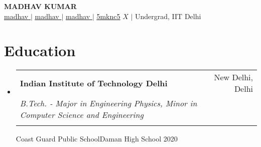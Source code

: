 \documentclass[letterpaper,11pt]{article}
\makeatletter
\newcommand{\resumeEduheading}[6]{
  \vspace{-2pt}\item
    \begin{tabular*}{0.97\textwidth}[t]{l@{\extracolsep{\fill}}r}
      \textbf{#1} & #2 \\
      \textit{\small #3}  & \text{\small #4} \\
      \text{\small #5}  & \textit{\small} \\
    \end{tabular*}\vspace{-7pt}
}
\newcommand{\resumeSubHeadingListStart}{\begin{itemize}[leftmargin=0.15in, label={}]}
\newcommand{\resumeSubHeadingListEnd}{\end{itemize}}
\makeatother
\begin{document}

\begin{center}
    \textbf{\Huge \scshape  MADHAV KUMAR } 
    \\ \vspace{10pt}
    \href{https://github.com/madhav-mknc}{\underline{madhav} \faGithub} $|$
    \href{https://www.linkedin.com/in/madhav-kumar-030785205/}{\underline{madhav} \faLinkedin} $|$
    \href{https://madhav-mknc.github.io/portfolio/}{\underline{madhav} \Mundus} $|$
   \href{https://twitter.com/5mknc5/}{\underline{5mknc5}} {$X$} $|$
    \small Undergrad, IIT Delhi
    
\end{center}


\section{Education}
  \resumeSubHeadingListStart
    \resumeEduheading
      {Indian Institute of Technology Delhi}{New Delhi, Delhi}
      {B.Tech. - Major in Engineering Physics, Minor in Computer Science and Engineering}
      {2020 -- Present}
      {}

    \resumeEduheading
      {Coast Guard Public School}{Daman}
      {High School}
      {2020}
      {}


  \resumeSubHeadingListEnd



    
\end{document}
